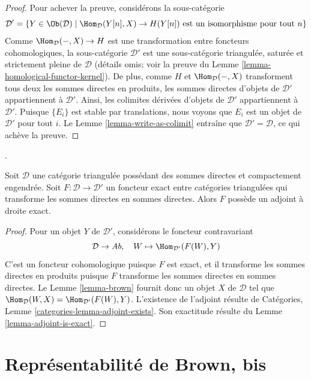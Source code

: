 \begin{proof}
\medskip\noindent
Pour achever la preuve, considérons la sous-catégorie
$$
\mathcal{D}' =
\{Y \in \Ob(\mathcal{D}) \mid \Hom_\mathcal{D}(Y[n], X) \to H(Y[n])
\text{ est un isomorphisme pour tout }n\}
$$
Comme $\Hom_\mathcal{D}(-, X) \to H$ est une transformation entre foncteurs
cohomologiques, la sous-catégorie $\mathcal{D}'$ est une sous-catégorie
triangulée, saturée et strictement pleine de $\mathcal{D}$ (détails omis;
voir la preuve du Lemme \ref{lemma-homological-functor-kernel}).
De plus, comme $H$ et $\Hom_\mathcal{D}(-, X)$ transforment tous deux les
sommes directes en produits, les sommes directes d'objets de $\mathcal{D}'$
appartiennent à $\mathcal{D}'$. Ainsi, les colimites dérivées d'objets de
$\mathcal{D}'$ appartiennent à $\mathcal{D}'$.
Puisque $\{E_i\}$ est stable par translations, nous voyons que $E_i$ est un
objet de $\mathcal{D}'$ pour tout $i$. Le
Lemme \ref{lemma-write-as-colimit} entraîne que
$\mathcal{D}' = \mathcal{D}$, ce qui achève la preuve.
\end{proof}

\begin{proposition}
\label{proposition-brown}
\begin{reference}
\cite[Theorem 4.1]{Neeman-Grothendieck}.
\end{reference}
Soit $\mathcal{D}$ une catégorie triangulée possédant des sommes directes et
compactement engendrée. Soit $F : \mathcal{D} \to \mathcal{D}'$ un foncteur
exact entre catégories triangulées qui transforme les sommes directes en
sommes directes. Alors $F$ possède un adjoint à droite exact.
\end{proposition}

\begin{proof}
Pour un objet $Y$ de $\mathcal{D}'$, considérons le foncteur contravariant
$$
\mathcal{D} \to \textit{Ab},\quad W \mapsto \Hom_{\mathcal{D}'}(F(W), Y)
$$
C'est un foncteur cohomologique puisque $F$ est exact, et il transforme les
sommes directes en produits puisque $F$ transforme les sommes directes en
sommes directes. Le Lemme \ref{lemma-brown} fournit donc un objet $X$ de
$\mathcal{D}$ tel que
$\Hom_\mathcal{D}(W, X) = \Hom_{\mathcal{D}'}(F(W), Y)$.
L'existence de l'adjoint résulte de
Catégories, Lemme \ref{categories-lemma-adjoint-exists}.
Son exactitude résulte du Lemme \ref{lemma-adjoint-is-exact}.
\end{proof}

\section{Représentabilité de Brown, bis}
\label{section-brown-bis}


